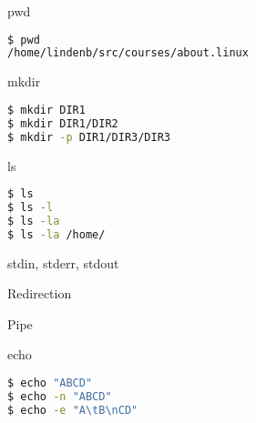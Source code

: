 \documentclass{beamer}
\begin{document}
\begin{frame}[fragile]
 \begin{center}
    \huge{pwd}\\
    \end{center}
\begin{lstlisting}[language=bash]
$ pwd
/home/lindenb/src/courses/about.linux
\end{lstlisting}
\end{frame}

\begin{frame}[fragile]
 \begin{center}
    \huge{mkdir}\\
    \end{center}
\begin{lstlisting}[language=bash]
$ mkdir DIR1
$ mkdir DIR1/DIR2
$ mkdir -p DIR1/DIR3/DIR3
\end{lstlisting}
\end{frame}

\begin{frame}[fragile]
 \begin{center}
    \huge{ls}\\
    \end{center}
\begin{lstlisting}[language=bash]
$ ls
$ ls -l
$ ls -la
$ ls -la /home/
\end{lstlisting}
\end{frame}

\begin{frame}[fragile]
 \begin{center}
    \huge{stdin, stderr, stdout}\\
  \end{center}
\end{frame}


\begin{frame}[fragile]
 \begin{center}
    \huge{Redirection}\\
  \end{center}
\end{frame}


\begin{frame}[fragile]
 \begin{center}
    \huge{Pipe}\\
  \end{center}
\end{frame}

\begin{frame}[fragile]
 \begin{center}
    \huge{echo}\\
    \end{center}
\begin{lstlisting}[language=bash]
$ echo "ABCD"
$ echo -n "ABCD"
$ echo -e "A\tB\nCD"
\end{lstlisting}
\end{frame}
\end{document}
